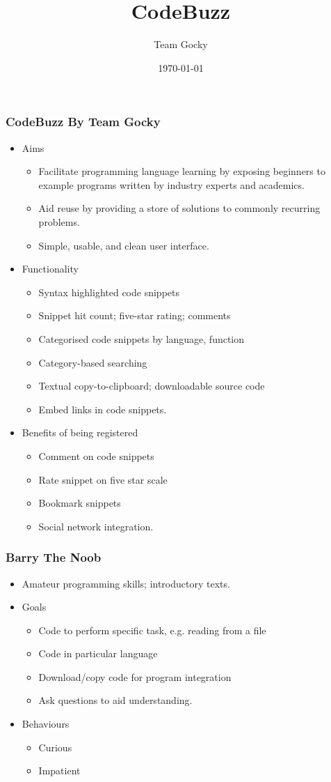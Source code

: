 \documentclass[handout, t]{beamer}
\title[DIM3 Project Presentation]{CodeBuzz}
\author{Team Gocky}
\institute{University Of Glasgow}
\date{\today}
\begin{document}
\begin{frame}
\frametitle{CodeBuzz By Team Gocky}
\begin{itemize}
\item Aims
    \begin{itemize}
    \item Facilitate programming language learning by exposing beginners to
    example programs written by industry experts and academics.
    \item Aid reuse by providing a store of solutions to commonly recurring
    problems.
    \item Simple, usable, and clean user interface.
    \end{itemize}
\item Functionality
    \begin{itemize}
    \item Syntax highlighted code snippets
    \item Snippet hit count; five-star rating; comments
    \item Categorised code snippets by language, function
    \item Category-based searching
    \item Textual copy-to-clipboard; downloadable source code
    \item Embed links in code snippets.
    \end{itemize}
\item Benefits of being registered
    \begin{itemize}
    \item Comment on code snippets
    \item Rate snippet on five star scale
    \item Bookmark snippets
    \item Social network integration.
    \end{itemize}
\end{itemize}
\end{frame}

\begin{frame}
\frametitle{Barry The Noob}
\begin{itemize}
\item Amateur programming skills; introductory texts.
\item Goals
    \begin{itemize}
    \item Code to perform specific task, e.g. reading from a file
    \item Code in particular language
    \item Download/copy code for program integration
    \item Ask questions to aid understanding.
    \end{itemize}
\item Behaviours
    \begin{itemize}
    \item Curious
    \item Impatient
    \end{itemize}
\end{itemize}
\end{frame}
\end{document}
